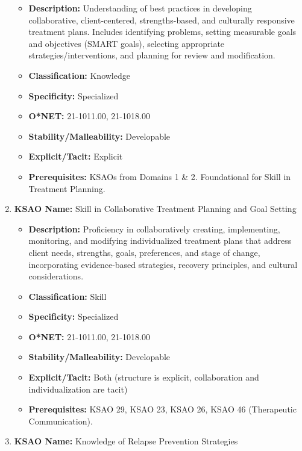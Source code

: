 \documentclass[
  letterpaper,
  DIV=11,
  numbers=noendperiod]{scrartcl}
\providecommand{\tightlist}{%
  \setlength{\itemsep}{0pt}\setlength{\parskip}{0pt}}
\begin{document}
\begin{enumerate}
  \begin{itemize}
  \tightlist
  \item
    \textbf{Description:} Understanding of best practices in developing
    collaborative, client-centered, strengths-based, and culturally
    responsive treatment plans. Includes identifying problems, setting
    measurable goals and objectives (SMART goals), selecting appropriate
    strategies/interventions, and planning for review and modification.
  \item
    \textbf{Classification:} Knowledge
  \item
    \textbf{Specificity:} Specialized
  \item
    \textbf{O*NET:} 21-1011.00, 21-1018.00
  \item
    \textbf{Stability/Malleability:} Developable
  \item
    \textbf{Explicit/Tacit:} Explicit
  \item
    \textbf{Prerequisites:} KSAOs from Domains 1 \& 2. Foundational for
    Skill in Treatment Planning.
  \end{itemize}
\item
  \textbf{KSAO Name:} Skill in Collaborative Treatment Planning and Goal
  Setting

  \begin{itemize}
  \tightlist
  \item
    \textbf{Description:} Proficiency in collaboratively creating,
    implementing, monitoring, and modifying individualized treatment
    plans that address client needs, strengths, goals, preferences, and
    stage of change, incorporating evidence-based strategies, recovery
    principles, and cultural considerations.
  \item
    \textbf{Classification:} Skill
  \item
    \textbf{Specificity:} Specialized
  \item
    \textbf{O*NET:} 21-1011.00, 21-1018.00
  \item
    \textbf{Stability/Malleability:} Developable
  \item
    \textbf{Explicit/Tacit:} Both (structure is explicit, collaboration
    and individualization are tacit)
  \item
    \textbf{Prerequisites:} KSAO 29, KSAO 23, KSAO 26, KSAO 46
    (Therapeutic Communication).
  \end{itemize}
\item
  \textbf{KSAO Name:} Knowledge of Relapse Prevention Strategies


\end{enumerate}
\end{document}
